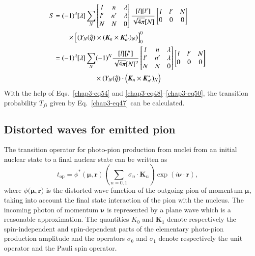 \begin{align}
  S & = (-1)^\lambda [\lambda] \sum_{N} \begin{bmatrix} l & n & \lambda\\ l' & n' & \lambda\\ N & N & 0  \end{bmatrix}
  \frac{[l][l']}{\sqrt{4 \pi}[N]} \begin{bmatrix}l & l' & N\\ 0 & 0 & 0  \end{bmatrix}\notag \\
       & \qquad  \times \Bigl[(Y_N ({\boldsymbol \hat{q}}) \times ({\boldsymbol K}_n \times {\boldsymbol K_{n'}^\ast})_N)\Bigr]_0^0\notag \\
  & = (-1)^\lambda [\lambda] \sum_{N} (-1)^N  \frac{[l][l']}{\sqrt{4 \pi}[N]^2}
  \begin{bmatrix} l & n & \lambda\\ l' & n' & \lambda\\ N & N & 0  \end{bmatrix}
  \begin{bmatrix}l & l' & N\\ 0 & 0 & 0  \end{bmatrix} \notag \\
  & \qquad \qquad \qquad \times (Y_N ({\boldsymbol \hat{q}}) \cdot  \Bigl({\boldsymbol K}_n \times {\boldsymbol K_{n'}^\ast})_N\Bigr)\label{chap3-eq54}
\end{align}
With the help of Eqs.\ \eqref{chap3-eq54} and \eqref{chap3-eq48}--\eqref{chap3-eq50}, the transition probability $T_{fi}$ given by Eq.\ \eqref{chap3-eq47} can be calculated.

\subsection{Distorted waves for emitted pion} \label{chap3-sec5.2}

The transition operator for photo-pion production from nuclei from an initial nuclear state to a final nuclear state can be written as
\begin{equation}
t_{\text{op}} = \phi^\ast (\boldsymbol{\mu, r}) \left( \sum_{n=0, 1} \sigma_n \cdot {\boldsymbol K}_n\right) \exp (i \boldsymbol{\nu \cdot r}), \label{chap3-eq55}
\end{equation}
where $\phi \boldsymbol{(\mu, r})$ is the distorted wave function of the outgoing pion of momentum $\boldsymbol{\mu}$, taking into account the final state interaction of the pion with the nucleus. The incoming photon of momentum $\boldsymbol{\nu}$ is represented by a plane wave which is a reasonable approximation. The quantities $K_0$ and ${\boldsymbol K}_1$ denote respectively the spin-independent and spin-dependent parts of the elementary photo-pion production amplitude and the operators $\sigma_0$ and $\sigma_1$ denote respectively the unit operator and the Pauli spin operator.


